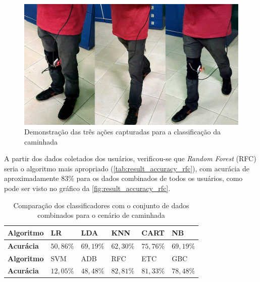 \begin{figure}[ht]
	\caption{\label{fig:result_estados}Demonstração das três ações capturadas para a classificação da caminhada}
	\begin{center}
		\includegraphics[width=.8\textwidth]{resources/result_estados}
	\end{center}
\end{figure}

A partir dos dados coletados dos usuários, verificou-se que \textit{Random Forest} (RFC) seria o algoritmo mais apropriado (\autoref{tab:result_accuracy_rfc}), com acurácia de aproximadamente \(83\%\) para os dados combinados de todos os usuários, como pode ser visto no gráfico da \autoref{fig:result_accuracy_rfc}.

\begin{table}[ht]
	\caption{Comparação dos classificadores com o conjunto de dados combinados para o cenário de caminhada}%
	\label{tab:result_accuracy_rfc}
	\begin{tabularx}{\textwidth}{X X X X X X}
		\toprule
		\textbf{Algoritmo} & LR            & LDA           & KNN           & CART          & NB            \\ \midrule
		\textbf{Acurácia}  & \(50,86\%\)   &   \(69,19\%\)   &   \(62,30\%\)   &   \(75,76\%\)   &   \(69,19\%\) \\ \bottomrule \toprule
		\textbf{Algoritmo} & SVM           & ADB           & RFC           & ETC           & GBC           \\ \midrule
		\textbf{Acurácia}  & \(12,05\%\)   &   \(48,48\%\)   &   \(82,81\%\)   &   \(81,33\%\)   &   \(78,48\%\) \\ \bottomrule
	\end{tabularx}
\end{table}

